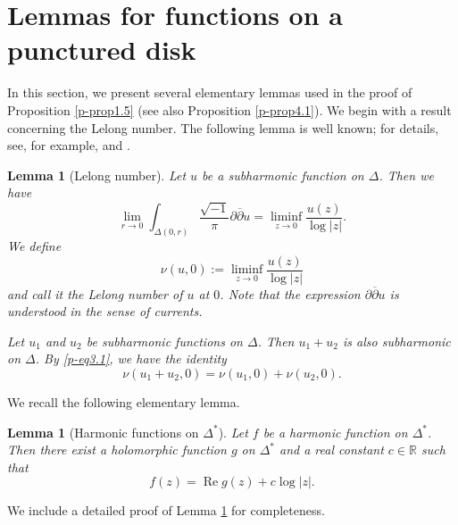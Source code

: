 \documentclass[12pt,twoside]{amsart}
\DeclareMathOperator{\re}{Re}
\newtheorem{lem}[thm]{Lemma}
\theoremstyle{definition}
\begin{document}
\section{Lemmas for functions on a punctured disk}\label{p-sec3} 

In this section, we present several elementary 
lemmas used in the proof of 
Proposition \ref{p-prop1.5} (see also Proposition \ref{p-prop4.1}).  
We begin with a result concerning the Lelong number.  
The following lemma is well 
known; for details, see, for example, 
\cite[2.B.~Lelong Numbers]{demailly1} and 
\cite[Chapter~III, (6.9) Example]{demailly}.

\begin{lem}[Lelong number]\label{p-lem3.1}
Let $u$ be a subharmonic function on $\Delta$. Then we have
\begin{equation}\label{p-eq3.1} 
\lim_{r \to 0} \int_{\Delta(0, r)} 
\frac{\sqrt{-1}}{\pi} \partial \overline{\partial} u 
= \liminf_{z \to 0} \frac{u(z)}{\log |z|}.
\end{equation}
We define
\[
\nu(u, 0) := \liminf_{z \to 0} \frac{u(z)}{\log |z|}
\]
and call it the {\em Lelong number} of $u$ at $0$. 
Note that the expression $\partial \overline{\partial} u$ is 
understood in the sense of currents.

Let $u_1$ and $u_2$ be subharmonic 
functions on $\Delta$. Then $u_1 + u_2$ is also subharmonic on $\Delta$.  
By \eqref{p-eq3.1}, we have the identity
\[
\nu(u_1 + u_2, 0) = \nu(u_1, 0) + \nu(u_2, 0).
\]
\end{lem}

We recall the following elementary lemma.

\begin{lem}[Harmonic functions on $\Delta^*$]\label{p-lem3.2}
Let $f$ be a harmonic function on $\Delta^*$. Then there 
exist a holomorphic function $g$ on $\Delta^*$ and a 
real constant $c \in \mathbb{R}$ such that
\[
f(z) = \re g(z) + c \log |z|.
\]
\end{lem}

We include a detailed proof of Lemma \ref{p-lem3.2} for completeness.
\end{document}
